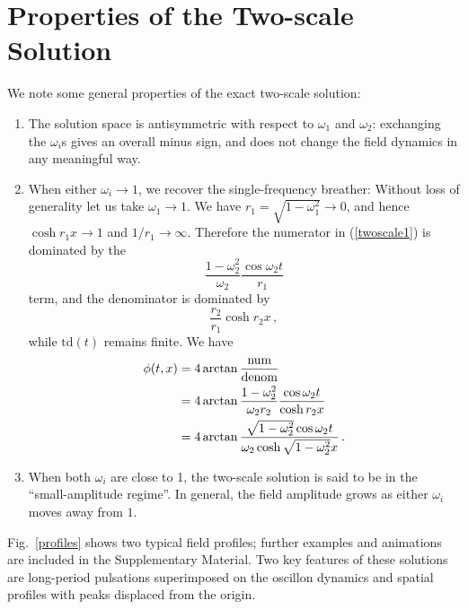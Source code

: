 \documentclass[%
reprint,
superscriptaddress,
amsmath,amssymb,
aps,
prd,
floatfix,
nofootinbib
]{revtex4-1}
\begin{document}
\section{Properties of the Two-scale Solution}
We note some general properties of the exact two-scale solution:
\begin{enumerate}
\item The solution space is antisymmetric with respect to  $\omega_1$ and $\omega_2$: exchanging the $\omega_i$s gives an overall minus sign, and does not change the field dynamics in any meaningful way.
  
\item When either $\omega_i \rightarrow 1$, we recover the single-frequency breather: Without loss of generality let us take $\omega_1\to1$. We have $r_1=\sqrt{1-\omega_1^2}\to0$, and hence $\cosh r_1 x\to1$ and $1/r_1 \to \infty$. Therefore the numerator in (\ref{twoscale1}) is dominated by the
  \begin{equation}
    \frac{1-\omega^2_2}{\omega_2}\frac{\cos\omega_2 t}{r_1}
  \end{equation}
  term, and the denominator is dominated by
  \begin{equation}
    \frac{r_2}{r_1}\cosh r_2 x\,,
  \end{equation}
  while $\mathrm{td}(t)$ remains finite. We have
  \begin{equation}\label{onescalep1}
    \begin{aligned}
      \phi(t,x) &= 4\arctan \frac{\rm num}{\rm denom}\\ &= 4\arctan \frac{1-\omega^2_2}{\omega_2 r_2}\frac{\cos\omega_2 t}{\cosh r_2 x}\\
      &=4\arctan \frac{\sqrt{1-\omega_2^2}\cos\omega_2 t}{\omega_2 \cosh \sqrt{1-\omega_2^2} x}\,.
    \end{aligned}
  \end{equation}

\item When both $\omega_i$ are close to 1, the two-scale solution is said to be in the ``small-amplitude regime''. In general, the field amplitude grows as either $\omega_i$ moves away from $1$.
\end{enumerate}

Fig.~\ref{profiles} shows two typical field profiles; further examples and animations are included in the Supplementary Material. Two key features of these solutions are long-period pulsations superimposed on the oscillon dynamics and spatial profiles with peaks displaced from the origin.    
\end{document}
